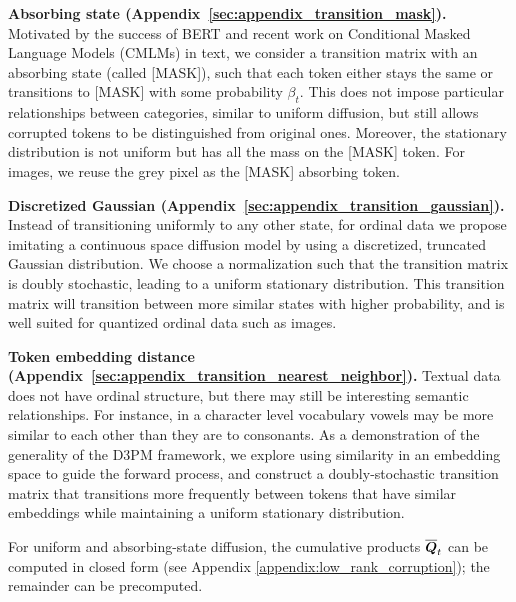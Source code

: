 \textbf{Absorbing state (Appendix~\ref{sec:appendix_transition_mask}).} Motivated by the success of BERT \citep{bert} and recent work on Conditional Masked Language Models (CMLMs) in text, we consider a transition matrix with an absorbing state (called [MASK]), such that each token either stays the same or transitions to [MASK] with some probability $\beta_t$. This does not impose particular relationships between categories, similar to uniform diffusion, but still allows corrupted tokens to be distinguished from original ones. Moreover, the stationary distribution is not uniform but has all the mass on the [MASK] token. For images, we reuse the grey pixel as the [MASK] absorbing token.

\textbf{Discretized Gaussian (Appendix~\ref{sec:appendix_transition_gaussian}).} Instead of transitioning uniformly to any other state, for ordinal data we propose imitating a continuous space diffusion model by using a discretized, truncated Gaussian distribution. We choose a normalization such that the transition matrix is doubly stochastic, leading to a uniform stationary distribution. This transition matrix will transition between more similar states with higher probability, and is well suited for quantized ordinal data such as images.

\textbf{Token embedding distance (Appendix~\ref{sec:appendix_transition_nearest_neighbor}).} Textual data does not have ordinal structure, but there may still be interesting semantic relationships. For instance, in a character level vocabulary vowels may be more similar to each other than they are to consonants. As a demonstration of the generality of the D3PM framework, we explore using similarity in an embedding space to guide the forward process, and construct a doubly-stochastic transition matrix that transitions more frequently between tokens that have similar embeddings while maintaining a uniform stationary distribution.

For uniform and absorbing-state diffusion, the cumulative products $\overline{\boldsymbol{Q}}_t$ can be computed in closed form (see Appendix \ref{appendix:low_rank_corruption}); the remainder can be precomputed.

